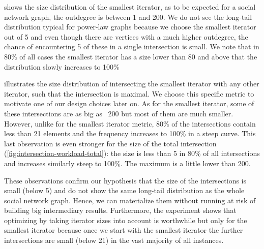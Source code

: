  shows the size distribution of the smallest iterator, as to be expected for a social network
graph, the outdegree is between 1 and 200.
We do not see the long-tail distribution typical for power-law graphs because we choose the smallest iterator out of 5 and even
though there are vertices with a much higher outdegree, the chance of encountering 5 of these in a single intersection is small.
We note that in 80\% of all cases the smallest iterator has a size lower than 80 and above that the distribution slowly increases to 100\%

 illustrates the size distribution of intersecting the smallest iterator with any other
iterator, such that the intersection is maximal.
We choose this specific metric to motivate one of our design choices later on.
As for the smallest iterator, some of these intersections are as big as ~200 but most of them are much smaller.
However, unlike for the smallest iterator metric, 80\% of the intersections contain less than 21  elements and the frequency increases to
100\% in a steep curve.
This last observation is even stronger for the size of the total intersection (\cref{fig:intersection-workload-total}):
the size is less than 5 in 80\% of all intersections and increases similarly steep to 100\%.
The maximum is a little lower than 200.

These observations confirm our hypothesis that the size of the intersections is small (below 5) and do not show the same long-tail
distribution as the whole social network graph.
Hence, we can materialize them without running at risk of building big intermediary results.
Furthermore, the experiment shows that optimizing by taking iterator sizes into account is worthwhile but only for the smallest iterator
because
once we start with the smallest iterator the further intersections are small (below 21) in the vast majority of all instances.


